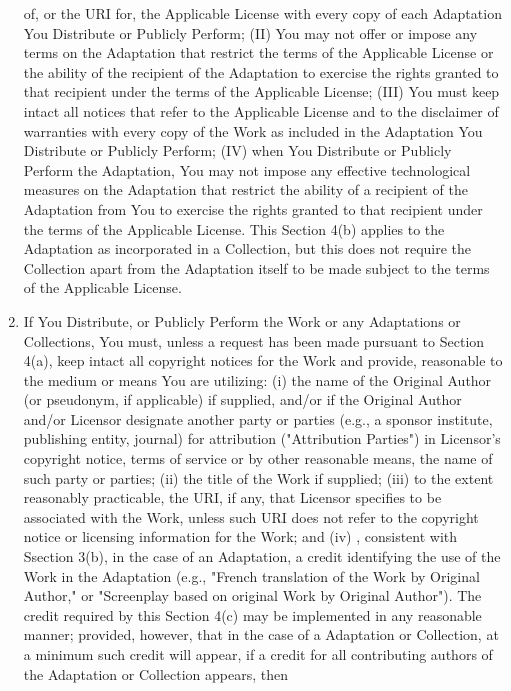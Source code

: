 \begin{enumerate}
  of, or the URI for, the Applicable License with every copy of each
  Adaptation You Distribute or Publicly Perform; (II) You may not
  offer or impose any terms on the Adaptation that restrict the terms
  of the Applicable License or the ability of the recipient of the
  Adaptation to exercise the rights granted to that recipient under
  the terms of the Applicable License; (III) You must keep intact all
  notices that refer to the Applicable License and to the disclaimer
  of warranties with every copy of the Work as included in the
  Adaptation You Distribute or Publicly Perform; (IV) when You
  Distribute or Publicly Perform the Adaptation, You may not impose
  any effective technological measures on the Adaptation that
  restrict the ability of a recipient of the Adaptation from You to
  exercise the rights granted to that recipient under the terms of
  the Applicable License. This Section 4(b) applies to the Adaptation
  as incorporated in a Collection, but this does not require the
  Collection apart from the Adaptation itself to be made subject to
  the terms of the Applicable License.
\item
  If You Distribute, or Publicly Perform the Work or any Adaptations
  or Collections, You must, unless a request has been made pursuant
  to Section 4(a), keep intact all copyright notices for the Work and
  provide, reasonable to the medium or means You are utilizing: (i)
  the name of the Original Author (or pseudonym, if applicable) if
  supplied, and/or if the Original Author and/or Licensor designate
  another party or parties (e.g., a sponsor institute, publishing
  entity, journal) for attribution ("Attribution Parties") in
  Licensor's copyright notice, terms of service or by other
  reasonable means, the name of such party or parties; (ii) the title
  of the Work if supplied; (iii) to the extent reasonably
  practicable, the URI, if any, that Licensor specifies to be
  associated with the Work, unless such URI does not refer to the
  copyright notice or licensing information for the Work; and (iv) ,
  consistent with Ssection 3(b), in the case of an Adaptation, a
  credit identifying the use of the Work in the Adaptation (e.g.,
  "French translation of the Work by Original Author," or "Screenplay
  based on original Work by Original Author"). The credit required by
  this Section 4(c) may be implemented in any reasonable manner;
  provided, however, that in the case of a Adaptation or Collection,
  at a minimum such credit will appear, if a credit for all
  contributing authors of the Adaptation or Collection appears, then

\end{enumerate}
